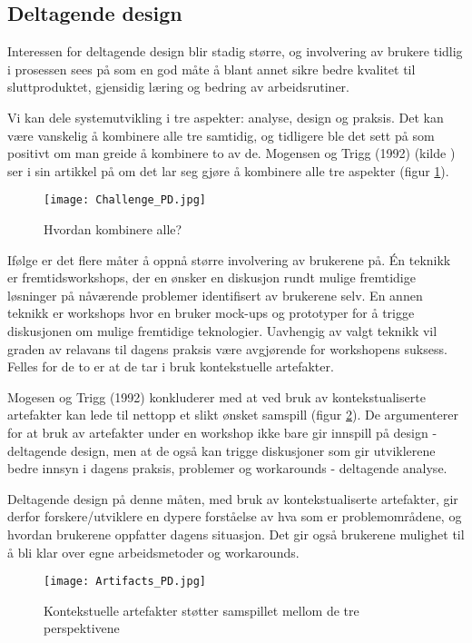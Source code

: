 \subsection{Deltagende design}
Interessen for deltagende design blir stadig større, og involvering av brukere tidlig i prosessen sees på som en god måte å blant annet sikre bedre kvalitet til sluttproduktet, gjensidig læring og bedring av arbeidsrutiner.

\noindent
Vi kan dele systemutvikling i tre aspekter: analyse, design og praksis. Det kan være vanskelig å kombinere alle tre samtidig, og tidligere ble det sett på som positivt om man greide å kombinere to av de. Mogensen og Trigg (1992) (kilde \cite{Mogensen92}) ser i sin artikkel på om det lar seg gjøre å kombinere alle tre aspekter (figur \ref{Challenge_PD}).

\begin{figure}[H]
\centering
\texttt{[image: Challenge\_PD.jpg]}
\caption{Hvordan kombinere alle?}
\label{Challenge_PD}
\end{figure}

\noindent
Ifølge \cite{Mogensen92} er det flere måter å oppnå større involvering av brukerene på. Én teknikk er fremtidsworkshops, der en ønsker en diskusjon rundt mulige fremtidige løsninger på nåværende problemer identifisert av brukerene selv. En annen teknikk er workshops hvor en bruker mock-ups og prototyper for å trigge diskusjonen om mulige fremtidige teknologier.  Uavhengig av valgt teknikk vil graden av relavans til dagens praksis være avgjørende for workshopens suksess. Felles for de to er at de tar i bruk kontekstuelle artefakter.

\noindent
Mogesen og Trigg (1992) konkluderer med at ved bruk av kontekstualiserte artefakter kan lede til nettopp et slikt ønsket samspill (figur \ref{Artifacts_PD}). De argumenterer for at bruk av artefakter under en workshop ikke bare gir innspill på design - deltagende design, men at de også kan trigge diskusjoner som gir utviklerene bedre innsyn i dagens praksis, problemer og workarounds - deltagende analyse. 

\noindent
Deltagende design på denne måten, med bruk av kontekstualiserte artefakter, gir derfor forskere/utviklere en dypere forståelse av hva som er problemområdene, og hvordan brukerene oppfatter dagens situasjon. Det gir også brukerene mulighet til å bli klar over egne arbeidsmetoder og workarounds.

\begin{figure}[H]
\centering
\texttt{[image: Artifacts\_PD.jpg]}
\caption{Kontekstuelle artefakter støtter samspillet mellom de tre perspektivene}
\label{Artifacts_PD}
\end{figure}
